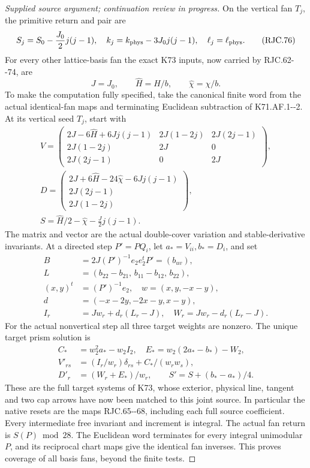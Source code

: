 \begin{proof}[Supplied source argument; continuation review in progress]
On the vertical fan \(T_j\), the primitive
return and pair are
\[
 S_j=S_0-\frac{J_0}{2}j(j-1),\quad
 k_j=k_{\rm phys}-3J_0j(j-1),\quad
 \ell_j=\ell_{\rm phys}.
 \tag{RJC.76}
\]
For every other lattice-basis fan the exact
K73 inputs, now carried by RJC.62-\/-74, are
\[
 J=J_0,\qquad \widehat H=H/b,\qquad
 \widehat\chi=\chi/b.
 \tag{RJC.77}
\]
To make the computation fully specified,
take the canonical finite word from the
actual identical-fan maps and terminating
Euclidean subtraction of K71.AF.1-\/-2.
At its vertical seed \(T_j\), start with
\[
\begin{gathered}
 V=\begin{pmatrix}
 2J-6\widehat H+6Jj(j-1)&2J(1-2j)&2J(2j-1)\\
 2J(1-2j)&2J&0\\
 2J(2j-1)&0&2J
 \end{pmatrix},\\
 D=\begin{pmatrix}
 2J+6\widehat H-24\widehat\chi-6Jj(j-1)\\
 2J(2j-1)\\2J(1-2j)
 \end{pmatrix},\\
 S=\widehat H/2-\widehat\chi-\frac J2j(j-1).
\end{gathered}
\tag{RJC.78}
\]
The matrix and vector are the actual double-cover
variation and stable-derivative invariants.
At a directed step \(P'=PQ_i\), let
\(a_*=V_{ii},b_*=D_i\), and set
\[
 \begin{split}
 B&=2J(P')^{-1}e_2e_2^tP'=(b_{uv}),\\
 L&=(b_{22}-b_{21},\,b_{11}-b_{12},\,b_{22}),\\
 (x,y)^t&=(P')^{-1}e_2,\quad
 w=(x,y,-x-y),\\
 d&=(-x-2y,-2x-y,x-y),\\
 I_r&=Jw_r+d_r(L_r-J),\quad
 W_r=Jw_r-d_r(L_r-J).
 \end{split}
 \tag{RJC.79}
\]
For the actual nonvertical step all three
target weights are nonzero. The unique
target prism solution is
\[
 \begin{split}
 C_*&=w_2^2a_*-w_2I_2,\quad
 E_*=w_2(2a_*-b_*)-W_2,\\
 V'_{rs}&=(I_r/w_r)\delta_{rs}+C_* /(w_rw_s),\\
 D'_r&=(W_r+E_*)/w_r,\qquad
 S'=S+(b_*-a_*)/4.
 \end{split}
 \tag{RJC.80}
\]
These are the full target systems of K73,
whose exterior, physical line, tangent
and two cap arrows have now been matched
to this joint source. In particular the
native resets are the maps RJC.65-\/-68,
including each full source coefficient.
Every intermediate free invariant and
increment is integral. The actual fan
return is \(S(P)\bmod28\).
The Euclidean word terminates for every
integral unimodular \(P\), and its
reciprocal chart maps give the identical
fan inverses. This proves coverage of
all basis fans, beyond the finite tests.


\end{proof}

